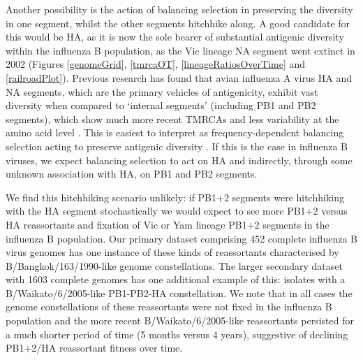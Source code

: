 \documentclass[11pt,oneside,letterpaper]{article}
\begin{document}
Another possibility is the action of balancing selection in preserving the diversity in one segment, whilst the other segments hitchhike along.
A good candidate for this would be HA, as it is now the sole bearer of substantial antigenic diversity within the influenza B population, as the Vic lineage NA segment went extinct in 2002 (Figures \ref{genomeGrid}, \ref{tmrcaOT}, \ref{lineageRatiosOverTime} and \ref{railroadPlot}).
Previous research has found that avian influenza A virus HA and NA segments, which are the primary vehicles of antigenicity, exhibit vast diversity when compared to `internal segments' (including PB1 and PB2 segments), which show much more recent TMRCAs and less variability at the amino acid level \citep{chen2006,obenauer2006}.
This is easiest to interpret as frequency-dependent balancing selection acting to preserve antigenic diversity \citep{worobey2014}.
If this is the case in influenza B viruses, we expect balancing selection to act on HA and indirectly, through some unknown association with HA, on PB1 and PB2 segments.

We find this hitchhiking scenario unlikely: if PB1+2 segments were hitchhiking with the HA segment stochastically we would expect to see more PB1+2 versus HA reassortants and fixation of Vic or Yam lineage PB1+2 segments in the influenza B population.
Our primary dataset comprising 452 complete influenza B virus genomes has one instance of these kinds of reassortants characterised by B/Bangkok/163/1990-like genome constellations.
The larger secondary dataset with 1603 complete genomes has one additional example of this: isolates with a B/Waikato/6/2005-like PB1-PB2-HA constellation.
We note that in all cases the genome constellations of these reassortants were not fixed in the influenza B population and the more recent B/Waikato/6/2005-like reassortants persisted for a much shorter period of time (5 months versus 4 years), suggestive of declining PB1+2/HA reassortant fitness over time.
\end{document}
